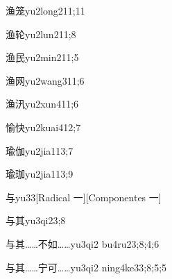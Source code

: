 \begin{verbete}{渔笼}{yu2long2}{11;11}
\end{verbete}

\begin{verbete}{渔轮}{yu2lun2}{11;8}
\end{verbete}

\begin{verbete}{渔民}{yu2min2}{11;5}
\end{verbete}

\begin{verbete}{渔网}{yu2wang3}{11;6}
\end{verbete}

\begin{verbete}{渔汛}{yu2xun4}{11;6}
\end{verbete}

\begin{verbete}{愉快}{yu2kuai4}{12;7}
\end{verbete}

\begin{verbete}{瑜伽}{yu2jia1}{13;7}
\end{verbete}

\begin{verbete}{瑜珈}{yu2jia1}{13;9}
\end{verbete}

\begin{verbete}{与}{yu3}{3}[Radical 一][Componentes 一]
\end{verbete}

\begin{verbete}{与其}{yu3qi2}{3;8}
\end{verbete}

\begin{verbete}{与其……不如……}{yu3qi2 bu4ru2}{3;8;4;6}
\end{verbete}

\begin{verbete}{与其……宁可……}{yu3qi2 ning4ke3}{3;8;5;5}
\end{verbete}


